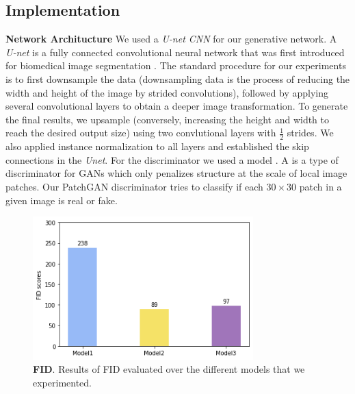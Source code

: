 \documentclass[10pt,twocolumn,letterpaper]{article}
\begin{document}
\subsection{Implementation}
\textbf{Network Architucture} We used a \textit{U-net CNN} for our generative network. A \textit{U-net} is a fully connected convolutional neural network that was first introduced for biomedical image segmentation \cite{unet}. The standard procedure for our experiments is to first downsample the data (downsampling data is the process of reducing the width and height of the image by strided convolutions), followed by applying several convolutional layers to obtain a deeper image transformation. To generate the final results, we upsample (conversely, increasing the height and width to reach the desired output size) using two convlutional layers with $\frac{1}{2}$ strides. We also applied instance normalization \cite{insnorm} to all layers and established the skip connections in the \textit{Unet}. For the discriminator we used a  model \cite{patchgan}. A  is a type of discriminator for GANs which only penalizes structure at the scale of local image patches. Our PatchGAN discriminator tries to classify if each $30 \times 30$ patch in a given image is real or fake.

\begin{figure}
	\includegraphics[width=23em]{fid.png}
	\caption{\textbf{FID}. Results of FID evaluated over the different models that we experimented.}
	\label{figure:fid}
\end{figure}
\end{document}

